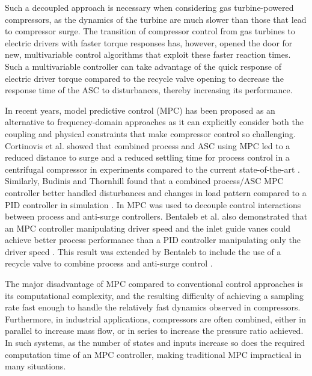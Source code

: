 Such a decoupled approach is necessary when considering gas turbine-powered compressors, as the dynamics of the turbine are much slower than those that lead to compressor surge. 
The transition of compressor control from gas turbines to electric drivers with faster torque responses has, however, opened the door for new, multivariable control algorithms that exploit these faster reaction times.
Such a multivariable controller can take advantage of the quick response of electric driver torque compared to the recycle valve opening to decrease the response time of the ASC to disturbances, thereby increasing its performance.

In recent years, model predictive control (MPC) has been proposed as an alternative to frequency-domain approaches as it can explicitly consider both the coupling and physical constraints that make compressor control so challenging.
Cortinovis et al. showed that combined process and ASC using MPC led to a reduced distance to surge and a reduced settling time for process control in a centrifugal compressor in experiments compared to the current state-of-the-art \cite{Cortinovis2015}. 
Similarly, Budinis and Thornhill found that a combined process/ASC MPC controller better handled disturbances and changes in load pattern compared to a PID controller in simulation \cite{Budinis2015}.
In \cite{Mercangoz2016} MPC was used to decouple control interactions between process and anti-surge controllers.
Bentaleb et al. also demonstrated that an MPC controller manipulating driver speed and the inlet guide vanes could achieve better process performance than a PID controller manipulating only the driver speed \cite{Bentaleb2014}.
This result was extended by Bentaleb to include the use of a recycle valve to combine process and anti-surge control \cite{Bentaleb2015}.

The major disadvantage of MPC compared to conventional control approaches is its computational complexity, and the resulting difficulty of achieving a sampling rate fast enough to handle the relatively fast dynamics observed in compressors. 
Furthermore, in industrial applications, compressors are often combined, either in parallel to increase mass flow, or in series to increase the pressure ratio achieved.
In such systems, as the number of states and inputs increase so does the required computation time of an MPC controller, making traditional MPC impractical in many situations. 

